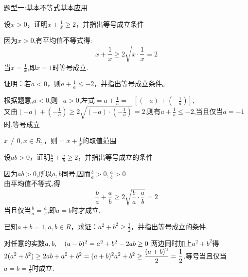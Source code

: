 \begin{tcolorbox} 
\centering
题型一:基本不等式基本应用
\end{tcolorbox}
\par
\begin{problem}
    设$x>0$，证明$\displaystyle x+\frac{1}{x} \ge 2$，并指出等号成立条件
    \begin{jiexi}
        因为$x>0$,有平均值不等式得:
        $$x+\frac{1}{x} \ge 2\sqrt{x\cdot\frac{1}{x}} = 2$$
        当$x=\frac{1}{x}$,即$x=1$时等号成立.
    \end{jiexi}
\end{problem}

\par
\begin{problem}
    证明：若$ a<0$，则$\displaystyle a+\frac{1}{a} \le -2$，并指出等号成立条件。
    \begin{jiexi}
       根据题意,$a<0$,则$-a>0$,左式$\displaystyle =a+\frac{1}{a}=-[(-a)+(-\frac{1}{a})]$,\\
       又由$\displaystyle (-a)+(-\frac{1}{a})\ge 2\sqrt{(-a)\cdot(-\frac{1}{a})} = 2$,则有$a+\frac{1}{a}\le -2$,当且仅当$a=-1$时,等号成立
    \end{jiexi}
\end{problem}

\par
\begin{problem}
    $x \ne 0,x\in R,$，则$\displaystyle =x+\frac{1}{x}$的取值范围\tiankong{$(-\infty,-2]\cup[2,+\infty)$}
\end{problem}

\par
\begin{problem}
    设$ab>0$，证明$\displaystyle \frac{b}{a}+\frac{a}{b}\ge 2$，并指出等号成立的条件
    \begin{jiexi}
        因为$ab>0$,所以$a,b$同号,因而$\displaystyle \frac{b}{a}>0,\frac{a}{b}>0$
        \\ 由平均值不等式,得
            $$
            \frac{b}{a}+\frac{a}{b}\ge 2\sqrt{\frac{b}{a}\cdot\frac{a}{b}}=2
            $$
            当且仅当$\displaystyle \frac{b}{a}=\frac{a}{b}$,即$a=b$时才成立.
     \end{jiexi}
\end{problem}

\par
\begin{problem}
    已知$a+b=1,a,b \in R$，求证：$\displaystyle a^2+b^2\ge \frac{1}{2}$，并指出等号成立的条件.
    \begin{jiexi}
        对任意的实数$a,b, \quad (a-b)^2 = a^2+b^2-2ab \ge 0\\$
        两边同时加上$a^2+b^2$得$\displaystyle 2(a^2+b^2)\ge 2ab +a^2+b^2=(a+b)^2\\
        a^2+b^2\ge \frac{(a+b)^2}{2} = \frac{1}{2}$.等号当且仅当$\displaystyle a=b=\frac{1}{2}$时成立.
    \end{jiexi}
\end{problem}

